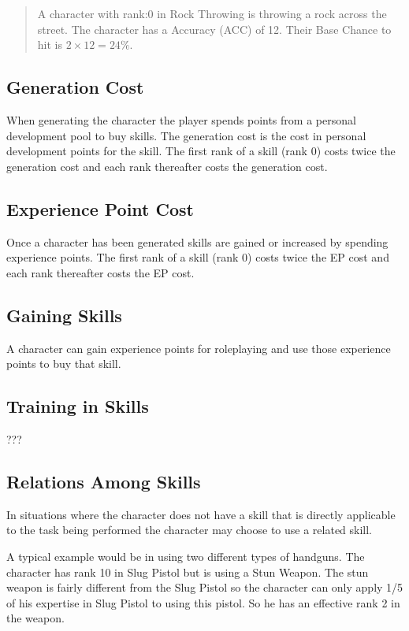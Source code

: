 \begin{quote}
A character with rank:0 in Rock Throwing is throwing a rock 
across the street. The character has a Accuracy (ACC) of 12. Their Base Chance 
to hit is \( 2 \times 12 = 24\% \).
\end{quote}

\subsection{Generation Cost}

When generating the character the player spends points from a
personal development pool to buy skills. The generation cost is the 
cost in personal development points for the skill. The first rank of 
a skill (rank 0) costs twice the generation cost and each rank 
thereafter costs the generation cost. 

\subsection{Experience Point Cost}

Once a character has been generated skills are gained or increased by 
spending experience points. The first rank of a skill (rank 0) costs 
twice the EP cost and each rank thereafter costs the EP cost. 

\subsection{Gaining Skills}

A character can gain experience points for roleplaying and use those 
experience points to buy that skill. 

\subsection{Training in Skills}

???

\subsection{Relations Among Skills}

In situations where the character does not have a skill that
is directly applicable to the task being performed the character 
may choose to use a related skill.

A typical example would be in using two different types of handguns. The
character has rank 10 in Slug Pistol but is using a Stun Weapon. The stun
weapon is fairly different from the Slug Pistol so the character can only
apply 1/5 of his expertise in Slug Pistol to using this pistol. So he has
an effective rank 2 in the weapon.

